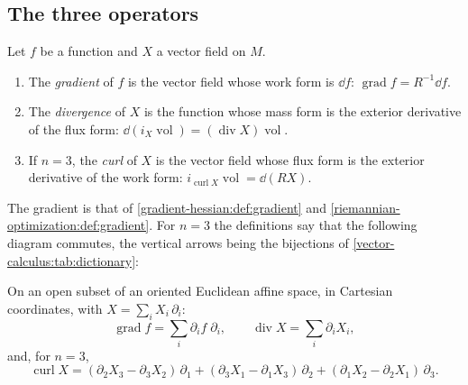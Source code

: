 \begin{notechapter}
\section{The three operators}\label{vector-calculus:sec:operators}

\begin{definition}
\label{vector-calculus:def:operators}
Let $f$ be a function and $X$ a vector field on $M$.
\begin{enumerate}[nosep]
  \item The \emph{gradient} of $f$ is the vector field whose work form
        is $\dd f$: $\operatorname{grad}f = R^{-1}\dd f$.
  \item The \emph{divergence} of $X$ is the function whose mass form is
        the exterior derivative of the flux form:
        $\dd(i_X\operatorname{vol})
        = (\operatorname{div}X)\operatorname{vol}$.
  \item If $n = 3$, the \emph{curl} of $X$ is the vector field whose
        flux form is the exterior derivative of the work form:
        $i_{\operatorname{curl}X}\operatorname{vol} = \dd(RX)$.
\end{enumerate}
\end{definition}

The gradient is that of \cref{gradient-hessian:def:gradient} and
\cref{riemannian-optimization:def:gradient}. For $n = 3$ the
definitions say that the following diagram commutes, the vertical
arrows being the bijections of \cref{vector-calculus:tab:dictionary}:
\begin{center}
\end{center}

\begin{theorem}\label{vector-calculus:thm:cartesian}
On an open subset of an oriented Euclidean affine space, in Cartesian
coordinates, with $X = \sum_iX_i\,\partial_i$:
\[
  \operatorname{grad}f = \sum_i\partial_if\;\partial_i ,
  \qquad
  \operatorname{div}X = \sum_i\partial_iX_i ,
\]
and, for $n = 3$,
\[
  \operatorname{curl}X
  = (\partial_2X_3 - \partial_3X_2)\,\partial_1
  + (\partial_3X_1 - \partial_1X_3)\,\partial_2
  + (\partial_1X_2 - \partial_2X_1)\,\partial_3 .
\]
\end{theorem}


\end{notechapter}
